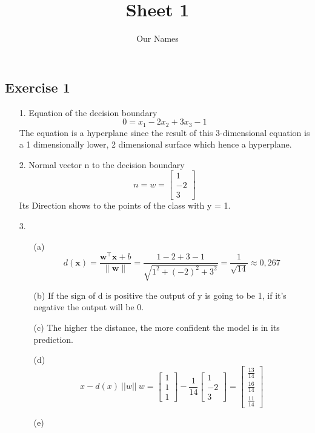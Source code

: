 \documentclass[12pt]{article}
\title{ Sheet 1 }
\author{Our Names}
\begin{document}
\maketitle

\vspace{0.5in}



\subsection*{Exercise 1}
\begin{itemize}

\item[1.] Equation of the decision boundary $$0 = x_1 -2x_2 + 3x_3 - 1$$
The equation is a hyperplane since the result of this 3-dimensional equation is a 1 dimensionally lower, 2 dimensional surface which hence a hyperplane.
\item[2.] Normal vector n to the decision boundary 
\[n = w = \begin{bmatrix} 1 \\ -2 \\ 3 \end{bmatrix}\] 
Its Direction shows to the points of the class with y = 1.
\vspace{1cm} %
\item[3.]
\begin{itemize}
\item[(a)] \[
d(\mathbf{x}) = \frac{\mathbf{w}^\top \mathbf{x} + b}{\|\mathbf{w}\|} = \frac{1-2+3-1}{\sqrt{1^2+(-2)^2+3^2}} = \frac{1}{\sqrt{14}} \approx 0,267 
\]
\vspace{1cm} %
\item[(b)] If the sign of d is positive the output of y is going to be 1, if it's negative the output will be 0.
\vspace{1cm} %
\item[(c)] The higher the distance, the more confident the model is in its prediction.
\vspace{1cm} %
\item[(d)] \[
x - d(x) \ ||w|| \ w = \begin{bmatrix} 1 \\ 1 \\ 1 \end{bmatrix} - \frac{1}{14}  \begin{bmatrix} 1 \\ -2 \\ 3 \end{bmatrix} = \begin{bmatrix} \frac{13}{14} \\ \frac{16}{14} \\ \frac{11}{14} \end{bmatrix}
\]
\vspace{1cm} %
\item[(e)] 
\vspace{1cm} %
\end{itemize}
\end{itemize}

\vspace{2in} %
\end{document}
